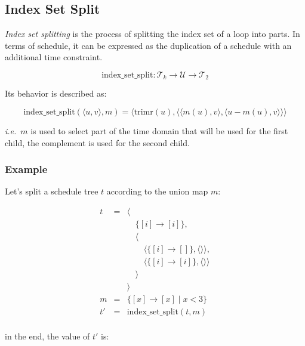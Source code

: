 \documentclass{article}
\begin{document}
\subsection{Index Set Split}

\emph{Index set splitting} is the process of splitting the index set of a loop
into parts. In terms of schedule, it can be expressed as the duplication of a
schedule with an additional time constraint.

\[
    \mathrm{index\_set\_split}: \mathcal{T}_k \rightarrow \mathcal{U} \rightarrow \mathcal{T}_2
\]

Its behavior is described as:

\[
    \mathrm{index\_set\_split}(\langle u, v\rangle, m) = \langle  \mathrm{trimr}(u), \langle  \langle  m(u), v\rangle, \langle  u - m(u), v\rangle \rangle \rangle
\]

\noindent \emph{i.e.}\ $m$ is used to select part of the time domain that will
be used for the first child, the complement is used for the second child.

\subsubsection*{Example}

Let's split a schedule tree $t$ according to the union map $m$:

\[
    \begin{array}{lcl}
        t &=& \langle \\
          & & \quad\{[i] \rightarrow [i] \},\\
          & & \quad\langle \\
          & & \quad\quad \langle\{ [i] \rightarrow [] \}, \langle\rangle\rangle,\\
          & & \quad\quad \langle\{ [i] \rightarrow [i] \}, \langle\rangle\rangle\\
          & & \quad\rangle \\
          & & \rangle \\
        m &=& \{ [x] \rightarrow [x] \mid x < 3 \} \\
        t'&=& \mathrm{index\_set\_split}(t, m) \\
    \end{array}
\]

\noindent in the end, the value of $t'$ is:
\end{document}
